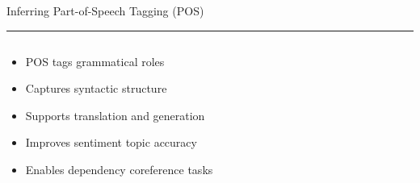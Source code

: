 \documentclass[aspectratio=169]{beamer}
\newcommand{\TitleFont}{\rmfamily}
\begin{document}
\begin{frame}[t]{}
  \vspace*{0.5cm}
  {\TitleFont\fontsize{18}{22}\selectfont\color{LUBronze}Inferring Part-of-Speech Tagging (POS)\par}
  \vspace{0.3em}
  {\color{LUBronze}\rule{\linewidth}{0.8pt}}\par
  \vspace{0.2cm}
  \begin{columns}[t]
    \begin{column}[t]{0.45\textwidth}
      \vspace*{0pt}
      \begin{itemize}\setlength\itemsep{0.65em}
        \item POS tags grammatical roles
        \item Captures syntactic structure
        \item Supports translation and generation
        \item Improves sentiment topic accuracy
        \item Enables dependency coreference tasks
      \end{itemize}
    \end{column}
  \end{columns}
\end{frame}
\end{document}
